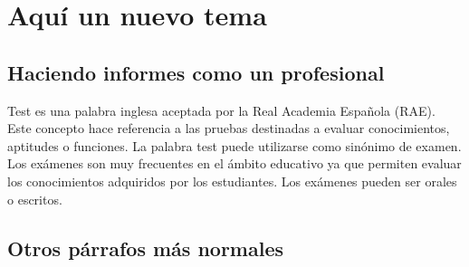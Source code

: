 		
\section{Aquí un nuevo tema}
		
	\subsection{Haciendo informes como un profesional}
	
	
		Test es una palabra inglesa aceptada por la Real Academia Española (RAE). Este concepto hace referencia a las pruebas destinadas a evaluar conocimientos, aptitudes o funciones. La palabra test puede utilizarse como sinónimo de examen. Los exámenes son muy frecuentes en el ámbito educativo ya que permiten evaluar los conocimientos adquiridos por los estudiantes. Los exámenes pueden ser orales o escritos.
		
		\newp \lipsum[115]
		
		\newp \lipsum[2]
		
		
		\lipsum[115]
		\vspace{\defaultnewlinesize}
		\lipsum[4]
		
	\subsection{Otros párrafos más normales}
	
		\lipsum[7]
		
		\newp \lipsum[2]
		
		
